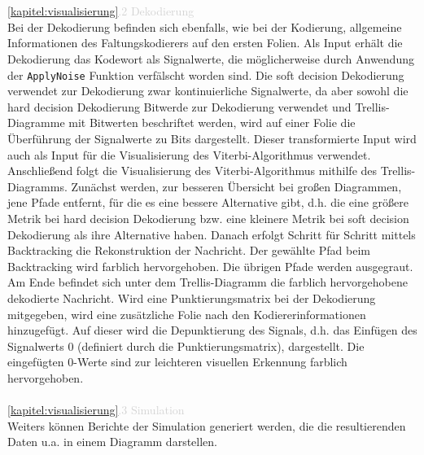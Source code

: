 \\\\
\textcolor{lightgray}{\ref{kapitel:visualisierung}.2 Dekodierung}\\
Bei der Dekodierung befinden sich ebenfalls, wie bei der Kodierung, allgemeine Informationen des Faltungskodierers auf den ersten Folien.
Als Input erhält die Dekodierung das Kodewort als Signalwerte, die möglicherweise durch Anwendung der \texttt{ApplyNoise} Funktion verfälscht worden sind. Die soft decision Dekodierung verwendet zur Dekodierung zwar kontinuierliche Signalwerte, da aber sowohl die hard decision Dekodierung Bitwerde zur Dekodierung verwendet und Trellis-Diagramme mit Bitwerten beschriftet werden, wird auf einer Folie die Überführung der Signalwerte zu Bits dargestellt. Dieser transformierte Input wird auch als Input für die Visualisierung des Viterbi-Algorithmus verwendet.
Anschließend folgt die Visualisierung des Viterbi-Algorithmus mithilfe des Trellis-Diagramms. Zunächst werden, zur besseren Übersicht bei großen Diagrammen, jene Pfade entfernt, für die es eine bessere Alternative gibt, d.h. die eine größere Metrik bei hard decision Dekodierung bzw. eine kleinere Metrik bei soft decision Dekodierung als ihre Alternative haben. Danach erfolgt Schritt für Schritt mittels Backtracking die Rekonstruktion der Nachricht. Der gewählte Pfad beim Backtracking wird farblich hervorgehoben. Die übrigen Pfade werden ausgegraut. Am Ende befindet sich unter dem Trellis-Diagramm die farblich hervorgehobene dekodierte Nachricht.
Wird eine Punktierungsmatrix bei der Dekodierung mitgegeben, wird eine zusätzliche Folie nach den Kodiererinformationen hinzugefügt. Auf dieser wird die Depunktierung des Signals, d.h. das Einfügen des Signalwerts 0 (definiert durch die Punktierungsmatrix), dargestellt. Die eingefügten 0-Werte sind zur leichteren visuellen Erkennung farblich hervorgehoben.
\\\\
\textcolor{lightgray}{\ref{kapitel:visualisierung}.3 Simulation}\\
Weiters können Berichte der Simulation generiert werden, die die resultierenden Daten u.a. in einem Diagramm darstellen.